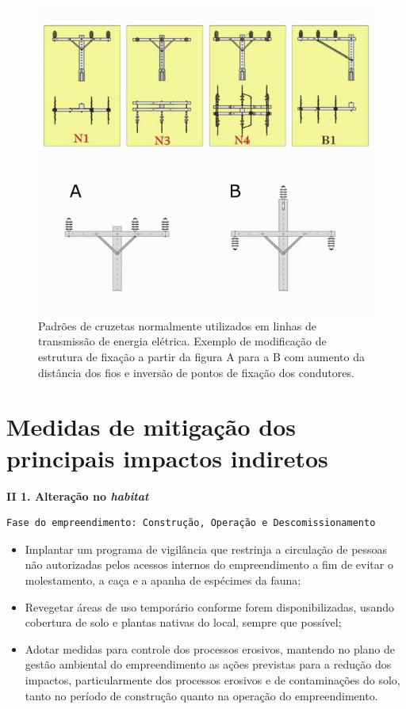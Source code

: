 \documentclass[
  oneside]{scrbook}
\providecommand{\tightlist}{%
  \setlength{\itemsep}{0pt}\setlength{\parskip}{0pt}}
\begin{document}
\begin{figure}[H]

{\centering \includegraphics[width=0.75\linewidth]{imagens/cap05/Figura_5.2} 

}

\caption{Padrões de cruzetas normalmente utilizados em linhas de transmissão de energia elétrica. Exemplo de modificação de estrutura de fixação a partir da figura A para a B com aumento da distância dos fios e inversão de pontos de fixação dos condutores.}\label{fig:17}
\end{figure}

\hypertarget{medidas-de-mitigauxe7uxe3o-dos-principais-impactos-indiretos}{%
\section{Medidas de mitigação dos principais impactos indiretos}\label{medidas-de-mitigauxe7uxe3o-dos-principais-impactos-indiretos}}

\textbf{II 1. Alteração no \emph{habitat} }

\begin{verbatim}
Fase do empreendimento: Construção, Operação e Descomissionamento  
\end{verbatim}

\begin{itemize}
\tightlist
\item
  Implantar um programa de vigilância que restrinja a circulação de pessoas não autorizadas pelos acessos internos do empreendimento a fim de evitar o molestamento, a caça e a apanha de espécimes da fauna;
\item
  Revegetar áreas de uso temporário conforme forem disponibilizadas, usando cobertura de solo e plantas nativas do local, sempre que possível;
\item
  Adotar medidas para controle dos processos erosivos, mantendo no plano de gestão ambiental do empreendimento as ações previstas para a redução dos impactos, particularmente dos processos erosivos e de contaminações do solo, tanto no período de construção quanto na operação do empreendimento.
\end{itemize}
\end{document}
